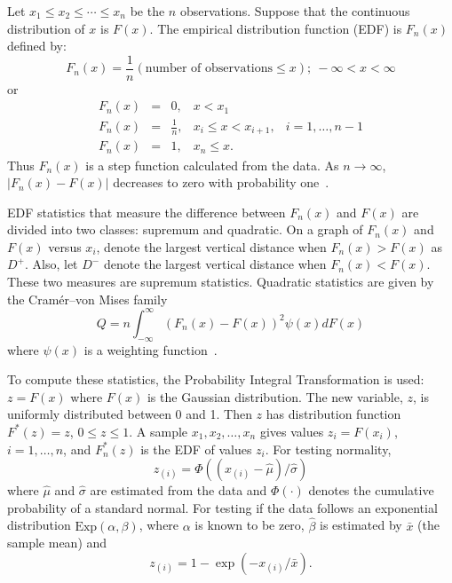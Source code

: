\documentclass[draft]{article}
\begin{document}
Let \(x_1 \le x_2 \le \cdots \le x_n\) be the \(n\)
observations. Suppose that the continuous distribution of \(x\)
is \(F\left(x\right)\). The empirical distribution function (EDF)
is \(F_n\left(x\right)\) defined by:
\begin{equation}
F_n\left(x\right) = \frac{1}{n}\left(\mbox{number of observations}
\le x\right); \: -\infty < x < \infty
\end{equation}
or
\begin{displaymath}
\begin{array}{rclll}
F_n\left(x\right)& = &0, & x<x_1\\
F_n\left(x\right)& = &\frac{1}{n}, & x_i\le x<x_{i+1}, & i=1,\ldots,n-1\\
F_n\left(x\right)& = &1, & x_n\le x.
\end{array}
\end{displaymath}
Thus \(F_n\left(x\right)\) is a step function calculated from
the data. As \(n\rightarrow\infty\), \\
\(\left|F_n\left(x\right)- F\left(x\right)\right|\)
decreases to zero with probability one~\cite{stephens86}.

EDF statistics that measure the difference between
\(F_n\left(x\right)\) and \(F\left(x\right)\) are divided
into two classes: supremum and quadratic.
On a graph of
\(F_n\left(x\right)\) and \(F\left(x\right)\) versus \(x_i\),
denote the largest vertical distance when
\(F_n\left(x\right)>F\left(x\right)\) as \(D^+\).
Also, let \(D^-\) denote the largest vertical distance when
\(F_n\left(x\right)<F\left(x\right)\). These two
measures are supremum statistics.
Quadratic statistics are given by the Cram\'er--von Mises family
\begin{equation}
\label{eqn:cramer-family}
Q = n\int_{-\infty}^{\infty}
\left(F_n\left(x\right) - F\left(x\right)\right)^2
\psi\left(x\right) d F\left(x\right)
\end{equation}
where \(\psi\left(x\right)\) is a weighting function~\cite{stephens86}.

To compute these statistics, the Probability Integral Transformation
is used: \(z=F\left(x\right)\) where \(F\left(x\right)\) is
the Gaussian distribution. The new variable, \(z\), is uniformly
distributed between 0 and 1. Then \(z\) has distribution
function \(F^*\left(z\right)=z\), \(0\le z\le1\).
A sample \(x_1, x_2, \ldots, x_n\) gives values \(z_i=F\left(x_i\right)\),
\(i=1, \ldots, n\), and \(F^*_n\left(z\right)\) is the EDF of
values \(z_i\). For testing normality,
\begin{equation}
z_{\left(i\right)} = \Phi\left(
\left(x_{\left(i\right)}-\hat{\mu}\right)/\hat{\sigma}
\right)
\end{equation}
where \(\hat{\mu}\) and \(\hat{\sigma}\) are estimated from
the data and \(\Phi\left(\cdot\right)\) denotes the cumulative
probability of a standard normal. For testing if the data
follows an exponential distribution \(\mbox{Exp}\left(\alpha,\beta\right)\),
where \(\alpha\) is known to be zero, \(\hat{\beta}\)
is estimated by \(\bar{x}\) (the sample mean) and
\begin{equation}
z_{\left(i\right)} = 1-\exp\left(-x_{\left(i\right)}/\bar{x}\right).
\end{equation}
\end{document}

